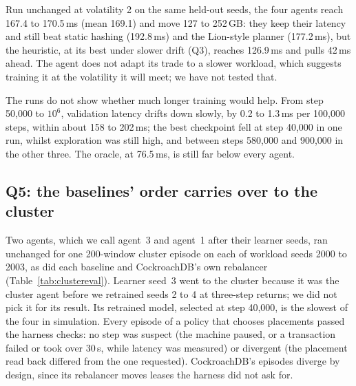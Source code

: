 Run unchanged at volatility 2 on the same held-out seeds, the four agents reach
167.4 to 170.5\,ms (mean 169.1) and move 127 to 252\,GB: they keep their
latency and still beat static hashing (192.8\,ms) and the Lion-style planner
(177.2\,ms), but the heuristic, at its best under slower drift (Q3), reaches
126.9\,ms and pulls 42\,ms ahead. The agent does not adapt its trade to a
slower workload, which suggests training it at the volatility it will meet; we
have not tested that.

The runs do not show whether much longer training would help. From step
50{,}000 to $10^6$, validation latency drifts down slowly, by 0.2 to 1.3\,ms per
100{,}000 steps, within about 158 to 202\,ms; the best checkpoint fell at step
40{,}000 in one run, whilst exploration was still high, and between steps
580{,}000 and 900{,}000 in the other three. The oracle, at 76.5\,ms, is still
far below every agent.

\subsection{Q5: the baselines' order carries over to the cluster}

Two agents, which we call agent~3 and agent~1 after their learner seeds, ran unchanged for one 200-window cluster episode on each of workload seeds 2000 to 2003, as did each baseline and CockroachDB's own rebalancer (Table~\ref{tab:clustereval}). Learner seed~3 went to the cluster because it was the cluster agent before we retrained seeds 2 to 4 at three-step returns; we did not pick it for its result. Its retrained model, selected at step 40{,}000, is the slowest of the four in simulation. Every episode of a policy that chooses placements passed the harness checks: no step was suspect (the machine paused, or a transaction failed or took over 30\,s, while latency was measured) or divergent (the placement read back differed from the one requested). CockroachDB's episodes diverge by design, since its rebalancer moves leases the harness did not ask for.

